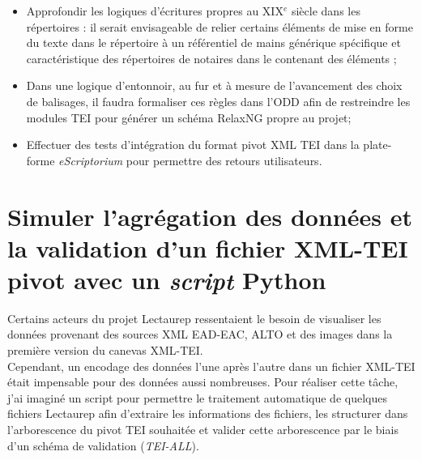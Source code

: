 \begin{itemize}
    Par exemple, une colonne correspond au type d'acte, la suivante au prix, la suivante au client etc.; dans un deuxième temps, il faudrait réunir les blocs horizontaux similaires si ces blocs concernent un même acte. Le dernier point ne constitue une tâche difficile dans la mesure où les répertoires de notaires présentent des écritures pouvant parfois déborder des colonnes ou prendre de la place sur plusieurs lignes. Toujours est-il que des outils existent comme \textit{Grobid}\footnote{Grobid documentation, URL: \url{https://grobid.readthedocs.io/en/latest/Introduction/}} (\textit{GeneRation Of BIbliographic Data}) pour extraire des informations sur la structure d'un document, parser et restructurer ces informations dans un format XML-TEI; un tel outil nécessiterai cependant des manipulations avant d'être exploitable sur les répertoires;\\
    \item Approfondir les logiques d'écritures propres au XIX$^e$ siècle dans les répertoires : il serait envisageable de relier certains éléments de mise en forme du texte dans le répertoire à un référentiel de mains générique spécifique et caractéristique des répertoires de notaires dans le  contenant des éléments ;\\
    \item Dans une logique d'entonnoir, au fur et à mesure de l'avancement des choix de balisages, il faudra formaliser ces règles dans l'ODD afin de restreindre les modules TEI pour générer un schéma RelaxNG propre au projet;\\
    \item Effectuer des tests d'intégration du format pivot XML TEI dans la plate-forme \textit{eScriptorium} pour permettre des retours utilisateurs. 
\end{itemize}
\newpage
\section{Simuler l'agrégation des données et la validation d'un fichier XML-TEI pivot avec un \textit{script} Python}\label{generator-lecto-dev}

Certains acteurs du projet Lectaurep ressentaient le besoin de visualiser les données provenant des sources XML EAD-EAC, ALTO et des images dans la première version du canevas XML-TEI.\\

Cependant, un encodage  des données l'une après l'autre dans un fichier XML-TEI était impensable pour des données aussi nombreuses. Pour réaliser cette tâche, j'ai imaginé un script pour permettre le traitement automatique de quelques fichiers Lectaurep afin d'extraire les informations des fichiers, les structurer dans l'arborescence du pivot TEI souhaitée et valider cette arborescence par le biais d'un schéma de validation (\textit{TEI-ALL}).\\


